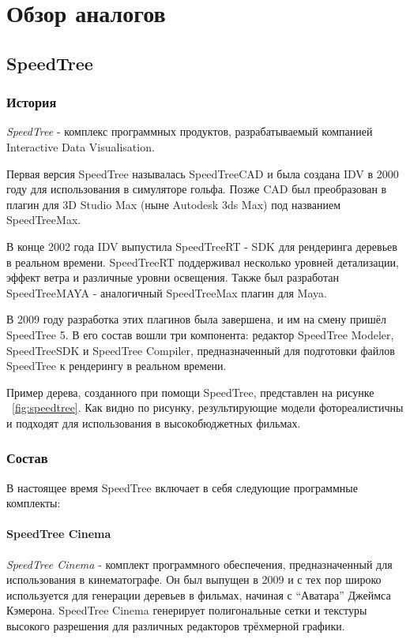 \chapter{Обзор аналогов}
\section{SpeedTree}
\subsection{История}
\emph{SpeedTree} - комплекс программных продуктов, разрабатываемый компанией Interactive Data Visualisation. 

Первая версия SpeedTree называлась SpeedTreeCAD и была создана IDV в 2000 году для использования в симуляторе гольфа. Позже CAD был преобразован в плагин для 3D Studio Max (ныне Autodesk 3ds Max) под названием SpeedTreeMax. 

В конце 2002 года IDV выпустила SpeedTreeRT - SDK для рендеринга деревьев в реальном времени. SpeedTreeRT поддерживал несколько уровней детализации, эффект ветра и различные уровни освещения. Также был разработан SpeedTreeMAYA - аналогичный SpeedTreeMax плагин для Maya. 

В 2009 году разработка этих плагинов была завершена, и им на смену пришёл SpeedTree 5. В его состав вошли три компонента: редактор SpeedTree Modeler, SpeedTreeSDK и SpeedTree Compiler, предназначенный для подготовки файлов SpeedTree к рендерингу в реальном времени. 

Пример дерева, созданного при помощи SpeedTree, представлен на рисунке ~\ref{fig:speedtree}. Как видно по рисунку, результирующие модели фотореалистичны и подходят для использования в высокобюджетных фильмах. 

\subsection{Состав}
В настоящее время SpeedTree включает в себя следующие программные комплекты:
\subsubsection{SpeedTree Cinema}
\emph{SpeedTree Cinema} - комплект программного обеспечения, предназначенный для использования в кинематографе. Он был выпущен в 2009 и с тех пор широко используется для генерации деревьев в фильмах, начиная с ``Аватара'' Джеймса Кэмерона. SpeedTree Cinema генерирует полигональные сетки и текстуры высокого разрешения для различных редакторов трёхмерной графики.

